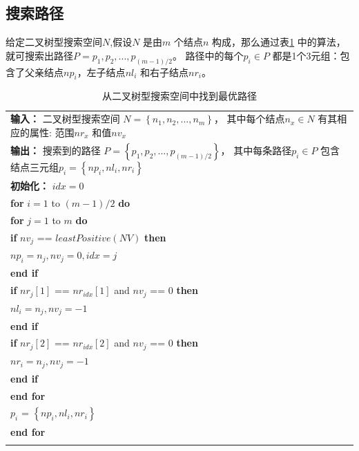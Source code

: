         \subsection{搜索路径}

        给定二叉树型搜索空间$N$,假设$N$ 是由$m$ 个结点$n$ 构成，那么通过表\ref{tab.c4_algori_bts} 中的算法，就可搜索出路径$P={p_1,p_2,...,p_{(m-1)/2}}$。 路径中的每个$p_i \in P$ 都是1个3元组：包含了父亲结点$np_i$，左子结点$nl_i$ 和右子结点$nr_i$。

    \begin{table}[!h]
    \renewcommand\arraystretch{1.5}
    \centering
    \caption{从二叉树型搜索空间中找到最优路径}
    \begin{tabular}{p{}}
    \toprule
    \textbf{输入：} 二叉树型搜索空间 $N=\left\{n_1,n_2,...,n_m\right\}$， 其中每个结点$n_x \in N$ 有其相应的属性: 范围$nr_x$ 和值$nv_x$ \\
    \textbf{输出：} 搜索到的路径 $P=\left\{p_1,p_2,...,p_{(m-1)/2}\right\}$， 其中每条路径$p_{i} \in P$ 包含结点三元组$p_{i}=\left\{np_{i},nl_{i},nr_{i}\right\}$ \\
    \midrule
    \textbf{初始化：} $idx = 0$\\
    \textbf{for} $i=1$ to $(m-1)/2$ \textbf{do} \\
    \qquad \textbf{for} $j=1$ to $m$ \textbf{do} \\
    \qquad \qquad \textbf{if} $nv_j$ == $leastPositive(NV)$ \textbf{then} \\
    \qquad \qquad \qquad $np_i = n_j, nv_j = 0, idx = j$ \\
    \qquad \qquad \textbf{end if} \\
    \qquad \qquad \textbf{if} $nr_j[1]$ == $nr_{idx}[1]$ and $nv_j$ == $0$ \textbf{then} \\
    \qquad \qquad \qquad $nl_i = n_j, nv_j = -1$ \\
    \qquad \qquad \textbf{end if} \\
    \qquad \qquad \textbf{if} $nr_j[2]$ == $nr_{idx}[2]$ and $nv_j$ == $0$ \textbf{then} \\
    \qquad \qquad \qquad $nr_i = n_j, nv_j = -1$ \\
    \qquad \qquad \textbf{end if} \\
    \qquad \textbf{end for} \\
    \qquad $p_{i}$ = $\left\{ np_{i},nl_{i},nr_{i} \right\}$ \\
    \textbf{end for} \\
    \bottomrule
    \label{tab.c4_algori_bts}
    \end{tabular}
    \end{table}

